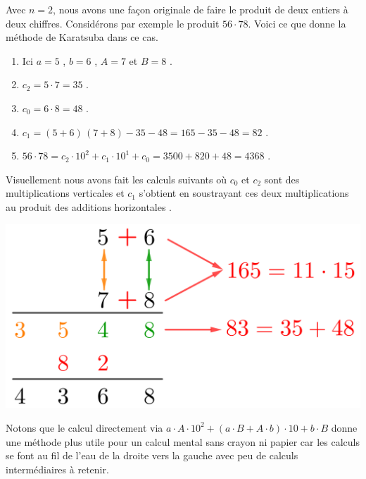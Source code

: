 
Avec $n = 2$, nous avons une façon originale de faire le produit de deux entiers à deux chiffres. Considérons par exemple le produit $56 \cdot 78$. Voici ce que donne la méthode de Karatsuba dans ce cas.
	
\begin{enumerate}
	\item Ici $a = 5$ , $b = 6$ , $A = 7$ et $B = 8$ .

	\item $c_2 = 5 \cdot 7 = 35$ .

	\item $c_0 = 6 \cdot 8 = 48$ .

	\item $c_1 = (5 + 6) \, (7 + 8) - 35 - 48 = 165 - 35 - 48 = 82$ .

	\item $56 \cdot 78 = c_2 \cdot 10^2 + c_1 \cdot 10^1 + c_0 = 3500 + 820 + 48 = 4368$ .
\end{enumerate}
	
\medskip
	
Visuellement nous avons fait les calculs suivants où $c_0$ et $c_2$ sont des multiplications \og verticales \fg{} et $c_1$ s'obtient en soustrayant ces deux multiplications au produit des \og additions horizontales \fg{}.
	
\begin{center}
	\includegraphics[scale=.75]{not-so-basic-arithmetic-ope/product-two-digits-karatsuba.png}
\end{center}

\medskip

Notons que le calcul directement via
$a \cdot A \cdot 10^2 + (a \cdot B + A \cdot b) \cdot 10 + b \cdot B$
donne une méthode plus utile pour un calcul mental sans crayon ni papier car les calculs se font au fil de l'eau de la droite vers la gauche avec peu de calculs intermédiaires à retenir.
	
